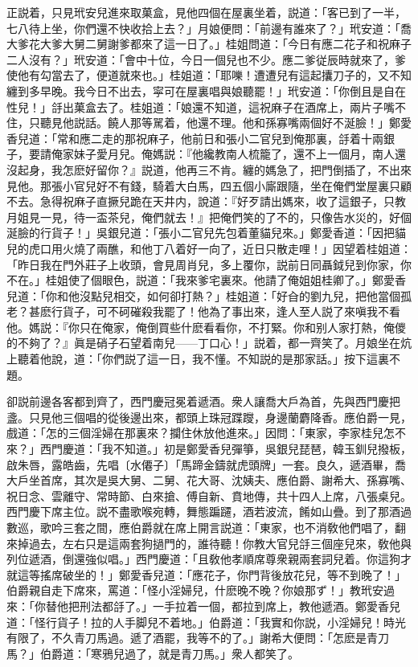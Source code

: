 正説着，只見玳安兒進來取菓盒，見他四個在屋裏坐着，説道：「客已到了一半，七八待上坐，你們還不快收拾上去？」月娘便問：「前邊有誰來了？」玳安道：「喬大爹花大爹大舅二舅謝爹都來了這一日了。」桂姐問道：「今日有應二花子和祝麻子二人沒有？」玳安道：「會中十位，今日一個兒也不少。應二爹従辰時就來了，爹使他有勾當去了，便道就來也。」桂姐道：「耶嚛！遭遭兒有這起攮刀子的，又不知纏到多早晚。我今日不出去，寜可在屋裏唱與娘聽罷！」玳安道：「你倒且是自在性兒！」㧱出菓盒去了。桂姐道：「娘還不知道，這祝麻子在酒席上，兩片子嘴不住，只聽見他説話。饒人那等駡着，他還不理。他和孫寡嘴兩個好不涎臉！」鄭愛香兒道：「常和應二走的那祝麻子，他前日和張小二官兒到俺那裏，㧱着十兩銀子，要請俺家妹子愛月兒。俺媽説：『他纔教南人梳籠了，還不上一個月，南人還沒起身，我怎麽好留你？』説道，他再三不肯。纏的媽急了，把門倒插了，不出來見他。那張小官兒好不有錢，騎着大白馬，四五個小廝跟隨，坐在俺們堂屋裏只顧不去。急得祝麻子直撅兒跪在天井内，說道：『好歹請出媽來，收了這銀子，只教月姐見一見，待一盃茶兒，俺們就去！』把俺們笑的了不的，只像告水災的，好個涎臉的行貨子！」吳銀兒道：「張小二官兒先包着董貓兒來。」鄭愛香道：「因把貓兒的虎口用火燒了兩醮，和他丁八着好一向了，近日只散走哩！」因望着桂姐道：「昨日我在門外莊子上收頭，會見周肖兒，多上覆你，説前日同聶鉞兒到你家，你不在。」桂姐使了個眼色，説道：「我來爹宅裏來。他請了俺姐姐桂卿了。」鄭愛香兒道：「你和他沒點兒相交，如何卻打熱？」桂姐道：「好㒲的劉九兒，把他當個孤老？甚麽行貨子，可不砢磪殺我罷了！他為了事出來，逢人至人説了來嗔我不看他。媽説：『你只在俺家，俺倒買些什麽看看你，不打緊。你和别人家打熱，俺儍的不夠了？』眞是硝子石望着南兒——丁口心！」説着，都一齊笑了。月娘坐在炕上聽着他說，道：「你們説了這一日，我不懂。不知説的是那家話。」按下這裏不題。

卻説前邊各客都到齊了，西門慶冠冕着遞酒。衆人讓喬大戶為首，先與西門慶把盞。只見他三個唱的從後邊出來，都頭上珠冠蹀躞，身邊蘭麝降香。應伯爵一見，戲道：「怎的三個淫婦在那裏來？攔住休放他進來。」因問：「東家，李家桂兒怎不來？」西門慶道：「我不知道。」初是鄭愛香兒彈箏，吳銀兒琵琶，韓玉釧兒撥板，啟朱唇，露皓齒，先唱〔水僊子〕「馬蹄金鑄就虎頭牌」一套。良久，遞酒畢，喬大戶坐首席，其次是吳大舅、二舅、花大哥、沈姨夫、應伯爵、謝希大、孫寡嘴、祝日念、雲離守、常時節、白來搶、傅自新、賁地傳，共十四人上席，八張桌兒。西門慶下席主位。説不盡歌喉宛轉，舞態蹁躚，酒若波流，餚如山疊。到了那酒過數巡，歌吟三套之間，應伯爵就在席上開言説道：「東家，也不消敎他們唱了，翻來掉過去，左右只是這兩套狗撾門的，誰待聽！你教大官兒㧱三個座兒來，敎他與列位遞酒，倒還強似唱。」西門慶道：「且敎他孝順席尊衆親兩套詞兒着。你這狗才就這等搖席破坐的！」鄭愛香兒道：「應花子，你門背後放花兒，等不到晚了！」伯爵親自走下席來，罵道：「怪小淫婦兒，什麽晚不晚？你娘那ず！」教玳安過來：「你替他把刑法都㧱了。」一手拉着一個，都拉到席上，教他遞酒。鄭愛香兒道：「怪行貨子！拉的人手脚兒不着地。」伯爵道：「我實和你説，小淫婦兒！時光有限了，不久青刀馬過。遞了酒罷，我等不的了。」謝希大便問：「怎麽是青刀馬？」伯爵道：「寒鴉兒過了，就是青刀馬。」衆人都笑了。

